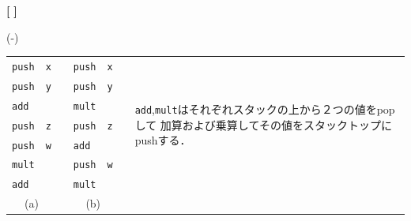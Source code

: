 \documentclass[dvipdfmx]{jarticle}
\newcounter{coffee}
\newcounter{bean}
\begin{document}
\begin{list}{{\bf [\,\,]}}{}
\begin{list}{(-)}{}
\begin{center}
	\begin{tabular}{llcllcp{}}
		\texttt{push} & \texttt{x} & \hspace*{5zw} & \texttt{push} & \texttt{x} & \quad & \multirow{7}{*}{
      \parbox{15zw}{\texttt{add},\texttt{mult}はそれぞれスタックの上から２つの値をpopして
    加算および乗算してその値をスタックトップにpushする．}}\\
		\texttt{push} & \texttt{y} & & \texttt{push} & \texttt{y}\\
		\texttt{add} & & & \texttt{mult} & \\
		\texttt{push} & \texttt{z} & & \texttt{push} & \texttt{z}\\
		\texttt{push} & \texttt{w} & & \texttt{add} & \\
		\texttt{mult} & & & \texttt{push} & \texttt{w}\\
		\texttt{add} & & & \texttt{mult} & \\[3pt]
		\multicolumn{2}{c}{(a)} & & \multicolumn{2}{c}{(b)}\\
	\end{tabular}
\end{center}


\end{list}
\end{list}
\end{document}
